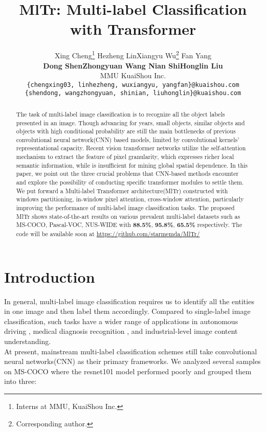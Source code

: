 \documentclass{article} \usepackage[numbers,sort&compress]{natbib}
\title{MlTr: Multi-label Classification with Transformer}
\author{
  Xing Cheng\thanks{Interns at MMU, KuaiShou Inc.} \quad Hezheng Lin\footnotemark[1] \quad Xiangyu Wu\thanks{Corresponding author.} \quad Fan Yang
  \\\textbf{ Dong Shen\quad Zhongyuan Wang \quad Nian Shi\footnotemark[1] \quad Honglin Liu}  \\
  MMU \quad KuaiShou Inc.\\
\texttt{\{chengxing03, linhezheng, wuxiangyu, yangfan\}@kuaishou.com} \\
  \texttt{\{shendong, wangzhongyuan, shinian, liuhonglin\}@kuaishou.com} \\
  
}
\begin{document}
\maketitle
\begin{abstract}
The task of multi-label image classification is to recognize all the object labels presented in an image. Though advancing for years, small objects, similar objects and objects with high conditional probability are still the main bottlenecks of previous convolutional neural network(CNN) based models, limited by convolutional kernels' representational capacity. Recent vision transformer networks utilize the self-attention mechanism to extract the feature of pixel granularity, which expresses richer local semantic information, while is insufficient for mining global spatial dependence. In this paper, we point out the three crucial problems that CNN-based methods encounter and explore the possibility of conducting specific transformer modules to settle them. We put forward a Multi-label Transformer architecture(MlTr) constructed with windows partitioning, in-window pixel attention, cross-window attention, particularly improving the performance of multi-label image classification tasks. The proposed MlTr shows state-of-the-art results on various prevalent multi-label datasets such as MS-COCO, Pascal-VOC, NUS-WIDE with \textbf{88.5\%}, \textbf{95.8\%}, \textbf{65.5\%} respectively. 
The code will be available soon at \url{https://github.com/starmemda/MlTr/}
\end{abstract}

\section{Introduction}
\label{intro}
In general, multi-label image classification requires us to identify all the entities in one image and then label them accordingly. Compared to single-label image classification, such tasks have a wider range of applications in autonomous driving \cite{levinson2011towards}, medical diagnosis recognition \cite{ge2018chest}, and industrial-level image content understanding.\\
At present, mainstream multi-label classification schemes still take convolutional neural networks(CNN) as their primary frameworks. We analyzed several samples on MS-COCO \cite{lin2014microsoft} where the resnet101 \cite{he2016deep} model performed poorly and grouped them into three:
\end{document}
